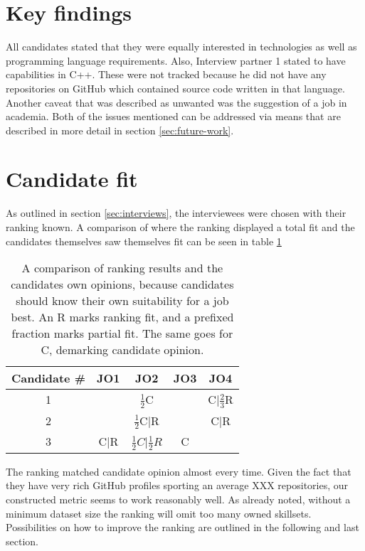 \section{Key findings}\label{sec:key-findings}
All candidates stated that they were equally interested in technologies as
well as programming language requirements. Also, Interview partner 1 stated to
have capabilities in C++. These were not tracked because he did not have any
repositories on GitHub which contained source code written in that language.
Another caveat that was described as unwanted was the suggestion of a job
in academia. Both of the issues mentioned can be addressed via means
that are described in more detail in section \ref{sec:future-work}.

\section{Candidate fit}
As outlined in section \ref{sec:interviews}, the interviewees were chosen with
their ranking known. A comparison of where the ranking displayed a total fit
and the candidates themselves saw themselves fit can be seen in table \ref{table:rank-comparison}

\begin{table}
\centering
\begin{tabular}{c|cccc}
Candidate \# & JO1 & JO2 & JO3 & JO4\\
\hline
           1 & & $\frac{1}{2}$C & & C|$\frac{2}{3}$R\\
           2 & & $\frac{1}{2}$C|R & & C|R\\
           3 & C|R & $\frac{1}{2}C$|$\frac{1}{2}R$ & C & \\
\end{tabular}
\caption{A comparison of ranking results and the candidates own opinions,
because candidates should know their own suitability for a job best. An R marks
ranking fit, and a prefixed fraction marks partial fit. The same goes for C,
demarking candidate opinion.}
\label{table:rank-comparison}
\end{table}

The ranking matched candidate opinion almost every time. Given the fact that
they have very rich GitHub profiles sporting an average XXX repositories, our
constructed metric seems to work reasonably well. As already noted, without
a minimum dataset size the ranking will omit too many owned skillsets.
Possibilities on how to improve the ranking are outlined in the following and
last section.